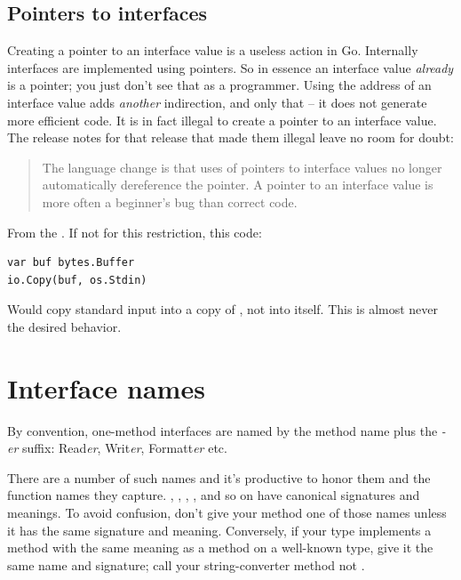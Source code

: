 \subsection{Pointers to interfaces}
Creating a pointer to an interface value is a useless action in Go.
Internally interfaces are implemented using pointers. So in
essence an interface value \emph{already} is a pointer; you just don't see that
as a programmer. Using the address of an interface value adds \emph{another}
indirection, and only that -- it does not generate more efficient code.
 It is in fact illegal to
create a pointer to an interface value. The release notes for that release that
made them illegal leave no room for doubt:
\begin{quote}
The language change is that uses of pointers to interface values no longer 
automatically dereference the pointer.  A pointer to an interface value is more 
often a beginner's bug than correct code.
\end{quote}
From the \cite{go_faq}.  If not for this restriction, this code:
\begin{lstlisting}
var buf bytes.Buffer
io.Copy(buf, os.Stdin)
\end{lstlisting}
Would copy standard input into a copy of , not into  itself. 
This is almost never the desired behavior.

\section{Interface names}
By convention, one-method interfaces are named by the method name plus
the \emph{-er} suffix: Read\emph{er}, Writ\emph{er}, Formatt\emph{er} etc.

There are a number of such names and it's productive to honor them and
the function names they capture. , ,
, ,  and
so on have canonical signatures and meanings. To avoid confusion, don't
give your method one of those names unless it has the same signature and
meaning. Conversely, if your type implements a method with the same
meaning as a method on a well-known type, give it the same name and
signature; call your string-converter method  not
.

